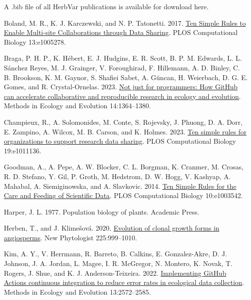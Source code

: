 \documentclass[
  letterpaper,
  DIV=11,
  numbers=noendperiod]{scrreprt}
\newlength{\cslhangindent}
\newenvironment{CSLReferences}[2] %
 {\begin{list}{}{%
  \setlength{\itemindent}{0pt}
  \setlength{\leftmargin}{0pt}
  \setlength{\parsep}{0pt}
  \ifodd #1
   \setlength{\leftmargin}{\cslhangindent}
   \setlength{\itemindent}{-1\cslhangindent}
  \fi
  \setlength{\itemsep}{#2\baselineskip}}}
 {\end{list}}
\begin{document}
A .bib file of all HerbVar publications is available for download here.

\label{refs}
\begin{CSLReferences}{1}{0}
Boland, M. R., K. J. Karczewski, and N. P. Tatonetti. 2017.
\href{https://doi.org/10.1371/journal.pcbi.1005278}{Ten {Simple Rules}
to {Enable Multi-site Collaborations} through {Data Sharing}}. PLOS
Computational Biology 13:e1005278.

Braga, P. H. P., K. Hébert, E. J. Hudgins, E. R. Scott, B. P. M.
Edwards, L. L. Sánchez Reyes, M. J. Grainger, V. Foroughirad, F.
Hillemann, A. D. Binley, C. B. Brookson, K. M. Gaynor, S. Shafiei Sabet,
A. Güncan, H. Weierbach, D. G. E. Gomes, and R. Crystal-Ornelas. 2023.
\href{https://doi.org/10.1111/2041-210X.14108}{Not just for programmers:
{How GitHub} can accelerate collaborative and reproducible research in
ecology and evolution}. Methods in Ecology and Evolution 14:1364--1380.

Champieux, R., A. Solomonides, M. Conte, S. Rojevsky, J. Phuong, D. A.
Dorr, E. Zampino, A. Wilcox, M. B. Carson, and K. Holmes. 2023.
\href{https://doi.org/10.1371/journal.pcbi.1011136}{Ten simple rules for
organizations to support research data sharing}. PLOS Computational
Biology 19:e1011136.

Goodman, A., A. Pepe, A. W. Blocker, C. L. Borgman, K. Cranmer, M.
Crosas, R. D. Stefano, Y. Gil, P. Groth, M. Hedstrom, D. W. Hogg, V.
Kashyap, A. Mahabal, A. Siemiginowska, and A. Slavkovic. 2014.
\href{https://doi.org/10.1371/journal.pcbi.1003542}{Ten {Simple Rules}
for the {Care} and {Feeding} of {Scientific Data}}. PLOS Computational
Biology 10:e1003542.

Harper, J. L. 1977. Population biology of plants. Academic Press.

Herben, T., and J. Klimešová. 2020.
\href{https://doi.org/10.1111/nph.16188}{Evolution of clonal growth
forms in angiosperms}. New Phytologist 225:999--1010.

Kim, A. Y., V. Herrmann, R. Barreto, B. Calkins, E. Gonzalez-Akre, D. J.
Johnson, J. A. Jordan, L. Magee, I. R. McGregor, N. Montero, K. Novak,
T. Rogers, J. Shue, and K. J. Anderson-Teixeira. 2022.
\href{https://doi.org/10.1111/2041-210X.13982}{Implementing {GitHub
Actions} continuous integration to reduce error rates in ecological data
collection}. Methods in Ecology and Evolution 13:2572--2585.


\end{CSLReferences}
\end{document}
